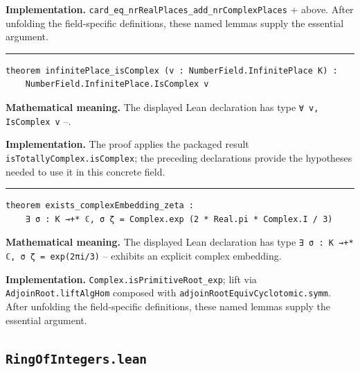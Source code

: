 \documentclass[UTF8,a4paper,11pt,fontset=fandol]{ctexart}
\theoremstyle{definition}
\newcommand{\statementsep}{\par\medskip\hrule\medskip}
\begin{document}
\noindent\textbf{Implementation.} \texttt{card\_\allowbreak{}eq\_\allowbreak{}nrRealPlaces\_\allowbreak{}add\_\allowbreak{}nrComplexPlaces} + above. After unfolding the field-specific definitions, these named lemmas supply the essential argument.\par
\statementsep
\begin{verbatim}
theorem infinitePlace_isComplex (v : NumberField.InfinitePlace K) :
    NumberField.InfinitePlace.IsComplex v
\end{verbatim}
\noindent\textbf{Mathematical meaning.} The displayed Lean declaration has type \texttt{∀ v, IsComplex v} --.\par
\noindent\textbf{Implementation.} The proof applies the packaged result \texttt{isTotallyComplex.\allowbreak{}isComplex}; the preceding declarations provide the hypotheses needed to use it in this concrete field.\par
\statementsep
\begin{verbatim}
theorem exists_complexEmbedding_zeta :
    ∃ σ : K →+* ℂ, σ ζ = Complex.exp (2 * Real.pi * Complex.I / 3)
\end{verbatim}
\noindent\textbf{Mathematical meaning.} The displayed Lean declaration has type \texttt{∃ σ : K →+* ℂ, σ ζ = exp(2πi/\allowbreak{}3)} -- exhibits an explicit complex embedding.\par
\noindent\textbf{Implementation.} \texttt{Complex.\allowbreak{}isPrimitiveRoot\_\allowbreak{}exp}; lift via \texttt{AdjoinRoot.\allowbreak{}liftAlgHom} composed with \texttt{adjoinRootEquivCyclotomic.\allowbreak{}symm}. After unfolding the field-specific definitions, these named lemmas supply the essential argument.\par

\subsection{\texttt{RingOfIntegers.lean}}
\end{document}
